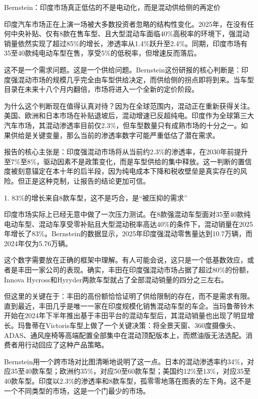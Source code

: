 \documentclass[11pt]{ctexart}
\begin{document}
Bernstein：印度市场真正低估的不是电动化，而是混动供给侧的再定价

印度汽车市场正在上演一场被大多数投资者忽略的结构性变化。2025年，在没有任何中央补贴、仅有8款在售车型、且大型混动车面临40\%高税率的环境下，强混动销量依然实现了超过85\%的增长，渗透率从1.4\%跃升至2.4\%。同期，印度市场有35至40款纯电动车型在售，享受5\%的低税率，但增速反而落后。

这不是一个需求问题。这是一个供给问题。Bernstein这份研报的核心判断是：印度强混动市场的规模几乎完全由车型供给决定，而供给侧的拐点即将到来。当车型目录在未来十八个月内翻倍，市场将进入一个全新的定价阶段。

为什么这个判断现在值得认真对待？因为在全球范围内，混动正在重新获得关注。美国、欧洲和日本市场在补贴退坡后，混动增速已反超纯电。印度作为全球第三大汽车市场，其混动渗透率目前仅2.3\%，但车型数量只有成熟市场的十分之一。如果供给是关键变量，那么当前的渗透率数字可能严重低估了潜在需求。

报告的核心主张是：印度强混动市场将从当前约2.3\%的渗透率，在2030年前提升至7\%至8\%，驱动因素不是政策变化，而是车型供给的集中释放。这一判断的置信度被刻意锚定在本十年的后半段，因为纯电成本下降和税收壁垒是真实存在的风险。但正是这种克制，让报告的结论更加可信。

1. 83\%的增长来自8款车型，这不是巧合，是“被压抑的需求”

印度市场实际上已经无意中做了一次压力测试。在8款强混动车型面对35至40款纯电动车型、混动车享受零补贴且大型混动税率高达40\%的条件下，混动销量在2025年增长了83\%。Bernstein的数据显示，2025年印度强混动零售量达到10.7万辆，而2024年仅为5.76万辆。

这个数字需要放在正确的框架中理解。有人可能会说，这只是一个低基数效应，或者是丰田一家公司的表现。确实，丰田在印度强混动市场占据了超过80\%的份额，Innova Hycross和Hyryder两款车型就占了全部混动销量的四分之三左右。

但这里的关键在于：丰田的高份额恰恰证明了供给限制的存在，而不是需求有限。直到最近，丰田几乎是唯一一家在印度规模化销售混动车型的车企。当玛鲁蒂铃木开始在2024年下半年推出基于丰田平台的混动车型后，其混动销量也出现了明显增长。玛鲁蒂在Victoris车型上做了一个关键决策：将全景天窗、360度摄像头、ADAS、通风座椅等高端配置全部集中在混动顶配版本上，而燃油版无法选配。消费者用行动回应了这种产品策略。

Bernstein用一个跨市场对比图清晰地说明了这一点。日本的混动渗透率约34\%，对应35至40款车型；欧洲约35\%，对应50至60款车型；美国约12\%至13\%，对应35至40款车型。印度以2.3\%的渗透率和8款车型，孤零零地落在图表的左下角。这不是一个不同类型的市场，这是一个门最少的市场。
\end{document}
